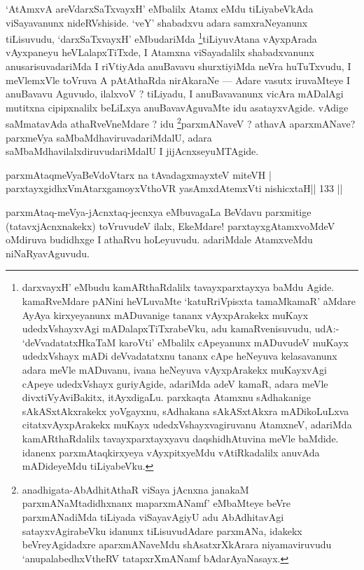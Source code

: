 \begin{artha}
`AtAmxvA areVdarxSaTxvayxH' eMbalilx Atamx eMdu tiLiyabeVkAda viSayavanunx nideRVshiside. `veY' shabadxvu adara samxraNeyanunx tiLisuvudu, `darxSaTxvayxH' eMbudariMda \footnote[4]{darxvayxH' eMbudu kamARthaRdalilx tavayxparxtayxya baMdu Agide. kamaRveMdare pANini heVLuvaMte `katuRriVpisxta tamaMkamaR' aMdare AyAya kirxyeyanunx mADuvanige tananx vAyxpArakekx muKayx udedxVshayxvAgi mADalapxTiTxrabeVku, adu kamaRvenisuvudu, udA:- `deVvadatatxHkaTaM karoVti' eMbalilx cApeyanunx mADuvudeV muKayx udedxVshayx mADi deVvadatatxnu tananx cApe heNeyuva kelasavanunx adara meVle mADuvanu, ivana heNeyuva vAyxpArakekx muKayxvAgi cApeye udedxVshayx guriyAgide, adariMda adeV kamaR, adara meVle divxtiVyAviBakitx, itAyxdigaLu. parxkaqta Atamxnu sAdhakanige sAkASxtAkxrakekx yoVgayxnu, sAdhakana sAkASxtAkxra mADikoLuLxva citatxvAyxpArakekx muKayx udedxVshayxvagiruvanu AtamxneV, adariMda kamARthaRdalilx tavayxparxtayxyavu daqshidhAtuvina meVle baMdide. idanenx parxmAtaqkirxyeya vAyxpitxyeMdu vAtiRkadalilx anuvAda mADideyeMdu tiLiyabeVku.}tiLiyuvAtana vAyxpArada vAyxpaneyu heVLalapxTiTxde, I Atamxna viSayadalilx shabadxvanunx anusarisuvadariMda I riVtiyAda anuBavavu shurxtiyiMda neVra huTuTxvudu, I meVlemxVle toVruva A pAtAthaRda nirAkaraNe  {\rm ---}  Adare vasutx iruvaMteye I anuBavavu Aguvudo, ilalxvoV ? tiLiyadu, I anuBavavanunx vicAra mADalAgi mutitxna cipipxnalilx beLiLxya anuBavavAguvaMte idu asatayxvAgide. vAdige saMmatavAda athaRveVneMdare ? idu \footnote[5]{anadhigata-AbAdhitAthaR viSaya jAcnxna janakaM parxmANaMtadidhxnanx maparxmANamf' eMbaMteye beVre parxmANadiMda tiLiyada viSayavAgiyU adu AbAdhitavAgi satayxvAgirabeVku idanunx tiLisuvudAdare parxmANa, idakekx beVreyAgidadxre aparxmANaveMdu shAsatxrXkArara niyamaviruvudu `anupalabedhxV\s theRV tatapxrXmANamf bAdarAyaNasayx.}parxmANaveV ? athavA aparxmANave?  parxmeVya saMbaMdhaviruvadariMdalU, adara saMbaMdhavilalxdiruvudariMdalU I jijAcnxseyuMTAgide.
\end{artha}

\begin{shl}
parxmAtaqmeVyaBeVdoV\s tarx na tAvadagxmayxteV miteVH |
parxtayxgidhxVmAtarxgamoyxV\s thoVR yasAmxdAtemxVti nishicxtaH\hfill || 133 ||
\end{shl}

\begin{artha}
 parxmAtaq-meVya-jAcnxtaq-jecnxya eMbuvagaLa BeVdavu parxmitige (tatavxjAcnxnakekx) toVruvudeV ilalx, EkeMdare! parxtayxgAtamxvoMdeV oMdiruva budidhxge I athaRvu hoLeyuvudu. adariMdale AtamxveMdu niNaRyavAguvudu.
\end{artha}

